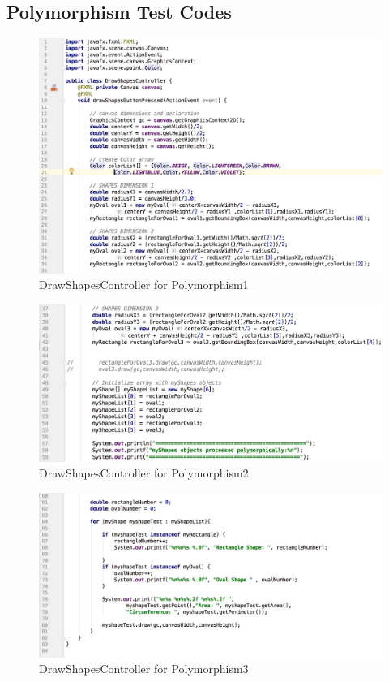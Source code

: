 \documentclass[a4paper,12pt]{article}
\begin{document}
\subsection{Polymorphism Test Codes}
\begin{figure}[H]
   \centering
   \includegraphics[width = 17cm]{Test_for_Polymorphism_part1} %
   \caption{DrawShapesController for Polymorphism1}
   \label{DrawShapesController for Polymorphism1}
\end{figure}


\begin{figure}[H]
   \centering
   \includegraphics[width = 17cm]{Test_for_Polymorphism_part2} %
   \caption{DrawShapesController for Polymorphism2}
   \label{DrawShapesController for Polymorphism2}
\end{figure}

\begin{figure}[H]
   \centering
   \includegraphics[width = 17cm]{Test_for_Polymorphism_part3} %
   \caption{DrawShapesController for Polymorphism3}
   \label{DrawShapesController for Polymorphism3}
\end{figure}
\end{document}
